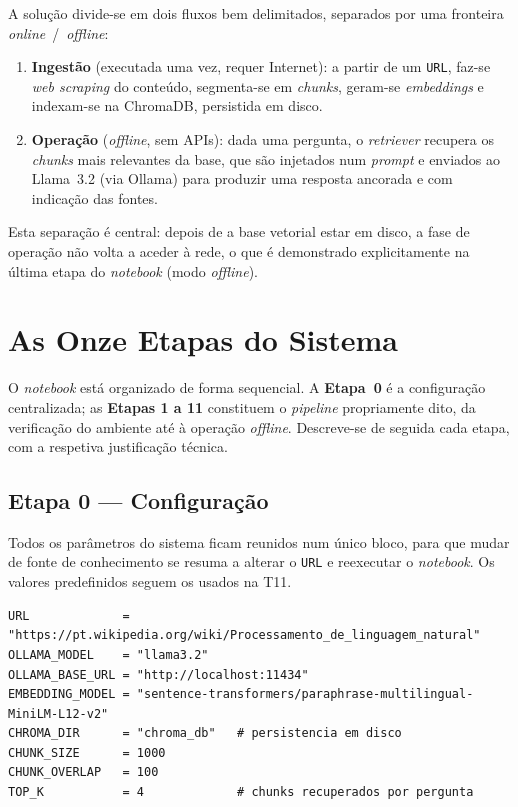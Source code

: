 \documentclass[]{ceurart}
\begin{document}
A solução divide-se em dois fluxos bem delimitados, separados por uma fronteira
\emph{online}~/~\emph{offline}:

\begin{enumerate}
  \item \textbf{Ingestão} (executada uma vez, requer Internet): a partir de um
        \texttt{URL}, faz-se \emph{web scraping} do conteúdo, segmenta-se em
        \emph{chunks}, geram-se \emph{embeddings} e indexam-se na ChromaDB,
        persistida em disco.
  \item \textbf{Operação} (\emph{offline}, sem APIs): dada uma pergunta, o
        \emph{retriever} recupera os \emph{chunks} mais relevantes da base, que
        são injetados num \emph{prompt} e enviados ao Llama~3.2 (via Ollama) para
        produzir uma resposta ancorada e com indicação das fontes.
\end{enumerate}

Esta separação é central: depois de a base vetorial estar em disco, a fase de
operação não volta a aceder à rede, o que é demonstrado explicitamente na última
etapa do \emph{notebook} (modo \emph{offline}).

\section{As Onze Etapas do Sistema}
\label{sec:etapas}

O \emph{notebook} está organizado de forma sequencial. A \textbf{Etapa~0} é a
configuração centralizada; as \textbf{Etapas 1 a 11} constituem o \emph{pipeline}
propriamente dito, da verificação do ambiente até à operação \emph{offline}.
Descreve-se de seguida cada etapa, com a respetiva justificação técnica.

\subsection*{Etapa 0 --- Configuração}

Todos os parâmetros do sistema ficam reunidos num único bloco, para que mudar de
fonte de conhecimento se resuma a alterar o \texttt{URL} e reexecutar o
\emph{notebook}. Os valores predefinidos seguem os usados na T11.

\begin{lstlisting}
URL             = "https://pt.wikipedia.org/wiki/Processamento_de_linguagem_natural"
OLLAMA_MODEL    = "llama3.2"
OLLAMA_BASE_URL = "http://localhost:11434"
EMBEDDING_MODEL = "sentence-transformers/paraphrase-multilingual-MiniLM-L12-v2"
CHROMA_DIR      = "chroma_db"   # persistencia em disco
CHUNK_SIZE      = 1000
CHUNK_OVERLAP   = 100
TOP_K           = 4             # chunks recuperados por pergunta
\end{lstlisting}
\end{document}
